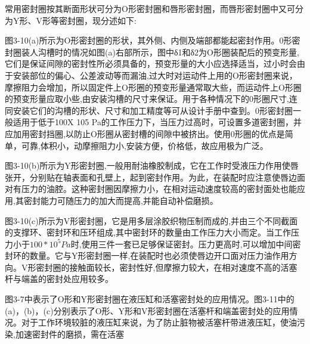 \indent 常用密封圈按其断面形状可分为O形密封圈和唇形密封圈，而唇形密封圈中又可分为Y形、V形等密封圈，现分述如下:

\indent 图3-10(a)所示为O形密封圈的形状，其外侧、内侧及端部都能起密封作用。0形密封圈装人沟槽时的情况如图(a)右部所示，图中δ1和δ2为O形圈装配后的预变形量,它们是保证间隙的密封性所必须具备的，预变形量的大小应选择适当，过小时会由于安装部位的偏心、公差波动等而漏油,过大时对运动件上用的O形密封圈来说，摩擦阻力会增加，所以固定件上O形圈的预变形量通常取大些，而运动件上O形圈的预变形量应取小些,由安装沟槽的尺寸来保证。用于各种情况下的0形圈尺寸,连同安装它们的沟槽的形状、尺寸和加工精度等可从设计手册中查到。0形密封圈一般适用于低于100X 105 Pa的工作压力下，当压力过高时，可设置多道密封圈，并应加用密封挡圈,以防止O形圈从密封槽的间隙中被挤出。使用0形圈的优点是简单，可靠,体积小，动摩擦阻力小,安装方便，价格低，故应用极为广泛。

\indent 图3-10(b)所示为Y形密封圈,一般用耐油橡胶制成，它在工作时受液压力作用使唇张开，分别贴在轴表面和孔壁上，起到密封作用。为此，在装配时应注意使唇边面对有压力的油腔。这种密封圈因摩擦力小，在相对运动速度较高的密封面处也能应用,其密封能力可随压力的加大而提高,并能自动补偿磨损。

\indent 图3-10(c)所示为V形密封圈，它是用多层涂胶织物压制而成的,并由三个不同截面的支撑环、密封环和压环组成,其中密封环的数量由工作压力大小而定。当工作压力小于$100*10^5 Pa$时,使用三件一套已足够保证密封。压力更高时,可以增加中间密封环的数量。它与Y形密封圈一样,在装配时也必须使唇边开口面对压力油作用方向。V形密封圈的接触面较长，密封性好,但摩擦力较大，在相对速度不高的活塞杆与端盖的密封处应用较多。

\indent 图3-7中表示了O形和Y形密封圈在液压缸和活塞密封处的应用情况。图3-11中的(a)，(b)，(c)分别表示了O形、Y形和V形密封圈在活塞杆和端盖密封处的应用情况。对于工作环境较脏的液压缸来说，为了防止脏物被活塞杆带进液压缸，使油污染,加速密封件的磨损，需在活塞




